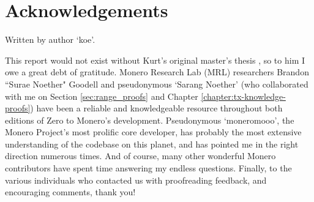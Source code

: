 \section{Acknowledgements}
\label{sec:acknowledgements}

Written by author `koe'.

This report would not exist without Kurt's original master's thesis \cite{kurt-original}, so to him I owe a great debt of gratitude. Monero Research Lab (MRL) researchers Brandon ``Surae Noether" Goodell and pseudonymous `Sarang Noether' (who collaborated with me on Section \ref{sec:range_proofs} and Chapter \ref{chapter:tx-knowledge-proofs}) have been a reliable and knowledgeable resource throughout both editions of Zero to Monero's development. Pseudonymous `moneromooo', the Monero Project's most prolific core developer, has probably the most extensive understanding of the codebase on this planet, and has pointed me in the right direction numerous times. And of course, many other wonderful Monero contributors have spent time answering my endless questions. Finally, to the various individuals who contacted us with proofreading feedback, and encouraging comments, thank you!

